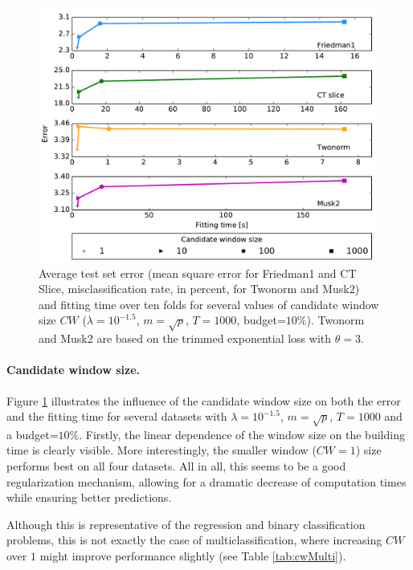 \documentclass{article}
\begin{document}
\begin{figure}[ht]
\begin{center}
\centerline{\includegraphics[width=\columnwidth]{cw_4}}
\caption{Average test set error (mean square error for Friedman1 and CT Slice, 
misclassification rate, in percent, for Twonorm and Musk2) and fitting time 
over ten folds for several values of candidate window size $CW$
($\lambda=10^{-1.5}$, $m=\sqrt{p}$, $T=1000$, budget=$10\%$). Twonorm and Musk2 
are based on the trimmed exponential loss with $\theta=3$. }
\label{fig:cw4}
\end{center}
\vskip -0.2in
\end{figure} 

\paragraph{Candidate window size.}
Figure \ref{fig:cw4} illustrates the influence of the candidate window size on 
both the error and the fitting time for several datasets with 
$\lambda=10^{-1.5}$, $m=\sqrt{p}$, $T=1000$ and a budget=$10\%$. 
Firstly, the linear dependence of the window size on the building time is 
clearly visible. More interestingly, the smaller window ($CW=1$) size performs 
best on all four datasets. All in all, this seems to be a good regularization 
mechanism, allowing for a dramatic decrease of computation times while ensuring 
better predictions.

Although this is representative of the regression and binary classification 
problems, this is not exactly the case of multiclassification, where increasing 
$CW$ over $1$ might improve performance slightly (see Table \ref{tab:cwMulti}).
\end{document}
